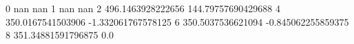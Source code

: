 0 nan nan
1 nan nan
2 496.1463928222656 144.79757690429688
4 350.0167541503906 -1.332061767578125
6 350.5037536621094 -0.845062255859375
8 351.34881591796875 0.0

